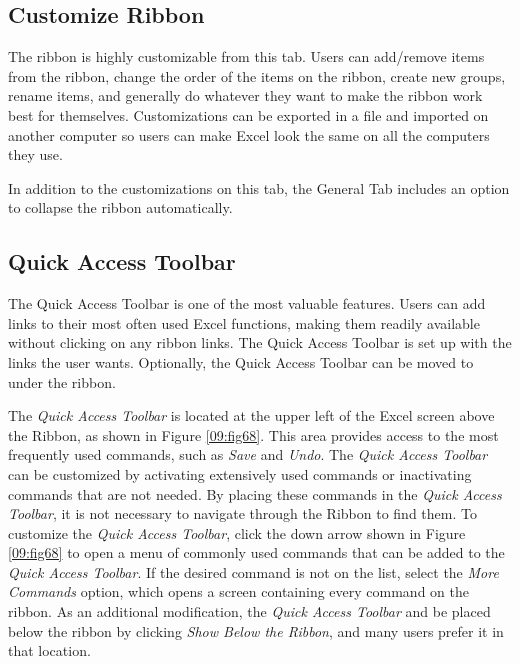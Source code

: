 \subsection{Customize Ribbon}

The ribbon is highly customizable from this tab. Users can add/remove items from the ribbon, change the order of the items on the ribbon, create new groups, rename items, and generally do whatever they want to make the ribbon work best for themselves. Customizations can be exported in a file and imported on another computer so users can make Excel look the same on all the computers they use.

In addition to the customizations on this tab, the General Tab includes an option to collapse the ribbon automatically.

\subsection{Quick Access Toolbar}

The Quick Access Toolbar is one of the most valuable features. Users can add links to their most often used Excel functions, making them readily available without clicking on any ribbon links. The Quick Access Toolbar is set up with the links the user wants. Optionally, the Quick Access Toolbar can be moved to under the ribbon.

The \textit{Quick Access Toolbar} is located at the upper left of the Excel screen above the Ribbon, as shown in Figure \ref{09:fig68}. This area provides access to the most frequently used commands, such as \textit{Save} and \textit{Undo}. The \textit{Quick Access Toolbar} can be customized by activating extensively used commands or inactivating commands that are not needed. By placing these commands in the \textit{Quick Access Toolbar}, it is not necessary to navigate through the Ribbon to find them. To customize the \textit{Quick Access Toolbar}, click the down arrow shown in Figure \ref{09:fig68} to open a menu of commonly used commands that can be added to the \textit{Quick Access Toolbar}. If the desired command is not on the list, select the \textit{More Commands} option, which opens a screen containing every command on the ribbon. As an additional modification, the \textit{Quick Access Toolbar} and be placed below the ribbon by clicking \textit{Show Below the Ribbon}, and many users prefer it in that location.

